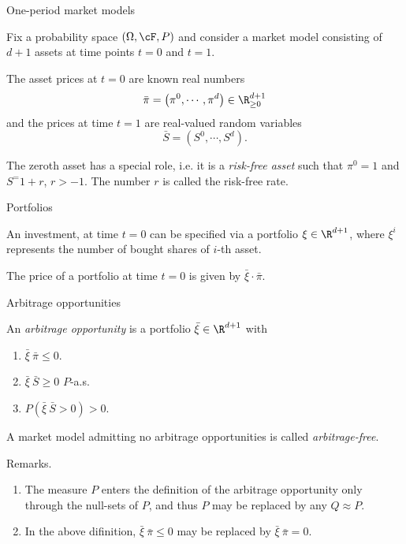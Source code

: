 


\begin{frame}
    {One-period market models}
  
    Fix a probability space $\left( \Omega, \cF, P \right)$ and consider a
    market model consisting of $d+1$ assets at time points $t=0$ and $t=1$.  

    The asset prices at $t=0$ are known real numbers 
    $$\bar{\pi} = \left( \pi^{0}, \cdots, \pi^{d} \right) \in \R_{\geq 0}^{d+1}$$
    and the prices at time $t=1$ are real-valued random variables
    $$\bar{S} = \left( S^0, \cdots, S^{d} \right).$$

    The zeroth asset has a special role, i.e. it is a \emph{risk-free asset} such
    that $\pi^{0} =1$ and $S^=1+r$, $r>-1$. The number $r$ is called the 
    risk-free rate.
\end{frame}


\begin{frame}
    {Portfolios}
    
    An investment, at time $t=0$ can be specified via a portfolio 
    $\xi \in \R^{d+1}$, where $\xi^{i}$ represents the number of 
    bought shares of $i$-th asset.

    The price of a portfolio at time $t=0$ is given by 
    $\bar{\xi} \cdot{} \bar{\pi}$.
\end{frame}


\begin{frame}
    {Arbitrage opportunities}
    
    An \emph{arbitrage opportunity} is a portfolio $\bar \xi \in \R^{d+1}$ with
    \begin{enumerate}
        \item $\bar \xi \ \bar \pi \leq 0$.
        \item $\bar{\xi} \ \bar{S}  \geq 0$ $P$-a.s.
        \item $P \left(  \bar{\xi} \ \bar{S} > 0   \right) >0$.
    \end{enumerate}
   
    A market model admitting no arbitrage opportunities is called
    \emph{arbitrage-free}. 

    \begin{block}{Remarks.}
        \begin{enumerate}
            \item The measure $P$ enters the definition of the arbitrage
                opportunity only through the null-sets of $P$, and thus $P$ may
                be replaced by any $Q \approx P$.
            \item In the above difinition, $\bar{\xi} \ \bar{\pi}\leq 0$
                may be replaced by $\bar{\xi} \ \bar{\pi} =0$.
        \end{enumerate}
    \end{block}
\end{frame}


